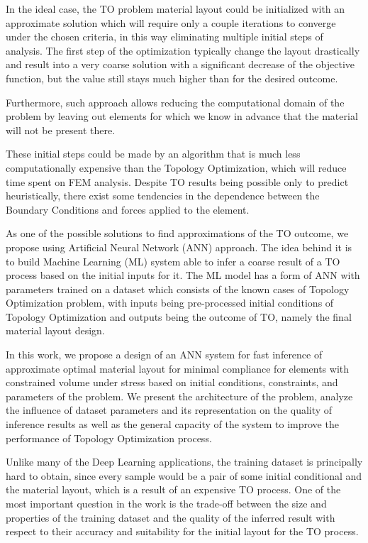 \medskip
In the ideal case, the TO problem material layout could be initialized with an approximate solution which will require only a couple iterations to converge under the chosen criteria, in this way eliminating multiple initial steps of analysis.
The first step of the optimization typically change the layout drastically and result into a very coarse solution with a significant decrease of the objective function, but the value still stays much higher than for the desired outcome. 
\medskip

Furthermore, such approach allows reducing the computational domain of the problem by leaving out elements for which we know in advance that the material will not be present there. 
\medskip
{}

These initial steps could be made by an algorithm that is much less computationally expensive than the Topology Optimization, which will reduce time spent on FEM analysis. 
Despite TO results being possible only to predict heuristically, there exist some tendencies in the dependence between the Boundary Conditions and forces applied to the element. 
\medskip

As one of the possible solutions to find approximations of the TO outcome, we propose using Artificial Neural Network (ANN) approach.
The idea behind it is to build Machine Learning (ML) system able to infer a coarse result of a TO process based on the initial inputs for it.
The ML model has a form of ANN with parameters trained on a dataset which consists of the known cases of Topology Optimization problem, with inputs being pre-processed initial conditions of Topology Optimization and outputs being the outcome of TO, namely the final material layout design.
\medskip

In this work, we propose a design of an ANN system for fast inference of approximate optimal material layout for minimal compliance for elements with constrained volume under stress based on initial conditions, constraints, and parameters of the problem. 
We present the architecture of the problem, analyze the influence of dataset parameters and its representation on the quality of inference results as well as the general capacity of the system to improve the performance of Topology Optimization process.  
\medskip

Unlike many of the Deep Learning applications, the training dataset is principally hard to obtain, since every sample would be a pair of some initial conditional and the material layout, which is a result of an expensive TO process. 
One of the most important question in the work is the trade-off between the size and properties of the training dataset and the quality of the inferred result with respect to their accuracy and suitability for the initial layout for the TO process.



